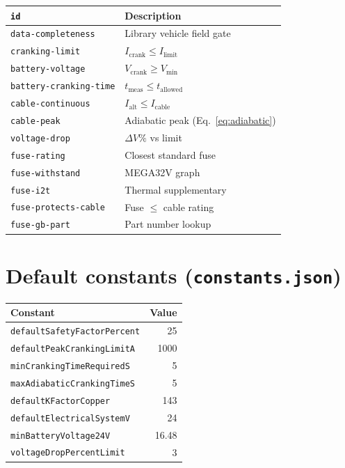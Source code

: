 \documentclass[11pt,a4paper]{report}
\begin{document}
\begin{table}[h]
  \centering
  \small
  \begin{tabular}{@{}ll@{}}
    \toprule
    \texttt{id} & Description \\
    \midrule
    \texttt{data-completeness} & Library vehicle field gate \\
    \texttt{cranking-limit} & $I_\mathrm{crank} \leq I_\mathrm{limit}$ \\
    \texttt{battery-voltage} & $V_\mathrm{crank} \geq V_\mathrm{min}$ \\
    \texttt{battery-cranking-time} & $t_\mathrm{meas} \leq t_\mathrm{allowed}$ \\
    \texttt{cable-continuous} & $I_\mathrm{alt} \leq I_\mathrm{cable}$ \\
    \texttt{cable-peak} & Adiabatic peak (Eq.~\ref{eq:adiabatic}) \\
    \texttt{voltage-drop} & $\Delta V\%$ vs limit \\
    \texttt{fuse-rating} & Closest standard fuse \\
    \texttt{fuse-withstand} & MEGA32V graph \\
    \texttt{fuse-i2t} & Thermal supplementary \\
    \texttt{fuse-protects-cable} & Fuse $\leq$ cable rating \\
    \texttt{fuse-gb-part} & Part number lookup \\
    \bottomrule
  \end{tabular}
\end{table}

\section{Default constants (\texttt{constants.json})}

\begin{table}[h]
  \centering
  \begin{tabular}{@{}lr@{}}
    \toprule
    Constant & Value \\
    \midrule
    \texttt{defaultSafetyFactorPercent} & 25 \\
    \texttt{defaultPeakCrankingLimitA} & 1000 \\
    \texttt{minCrankingTimeRequiredS} & 5 \\
    \texttt{maxAdiabaticCrankingTimeS} & 5 \\
    \texttt{defaultKFactorCopper} & 143 \\
    \texttt{defaultElectricalSystemV} & 24 \\
    \texttt{minBatteryVoltage24V} & 16.48 \\
    \texttt{voltageDropPercentLimit} & 3 \\
    \bottomrule
  \end{tabular}
\end{table}
\end{document}

